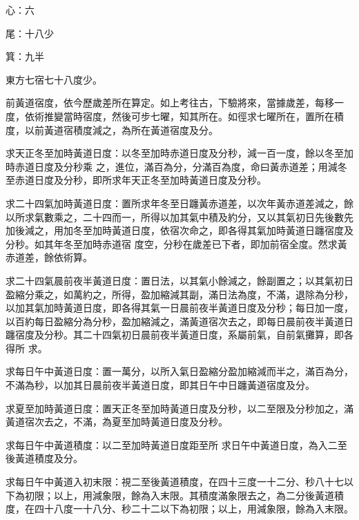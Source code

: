 \begin{pinyinscope}
 心：六



 尾：十八少



 箕：九半



 東方七宿七十八度少。



 前黃道宿度，依今歷歲差所在算定。如上考往古，下驗將來，當據歲差，每移一度，依術推變當時宿度，然後可步七曜，知其所在。如徑求七曜所在，置所在積度，以前黃道宿積度減之，為所在黃道宿度及分。



 求天正冬至加時黃道日度：以冬至加時赤道日度及分秒，減一百一度，餘以冬至加時赤道日度及分秒乘
 之，進位，滿百為分，分滿百為度，命曰黃赤道差；用減冬至赤道日度及分秒，即所求年天正冬至加時黃道日度及分秒。



 求二十四氣加時黃道日度：置所求年冬至日躔黃赤道差，以次年黃赤道差減之，餘以所求氣數乘之，二十四而一，所得以加其氣中積及約分，又以其氣初日先後數先加後減之，用加冬至加時黃道日度，依宿次命之，即各得其氣加時黃道日躔宿度及分秒。如其年冬至加時赤道宿
 度空，分秒在歲差已下者，即加前宿全度。然求黃赤道差，餘依術算。



 求二十四氣晨前夜半黃道日度：置日法，以其氣小餘減之，餘副置之；以其氣初日盈縮分乘之，如萬約之，所得，盈加縮減其副，滿日法為度，不滿，退除為分秒，以加其氣加時黃道日度，即各得其氣一日晨前夜半黃道日度及分秒；每日加一度，以百約每日盈縮分為分秒，盈加縮減之，滿黃道宿次去之，即每日晨前夜半黃道日躔宿度及分秒。其二十四氣初日晨前夜半黃道日度，系屬前氣，自前氣攤算，即各得所
 求。



 求每日午中黃道日度：置一萬分，以所入氣日盈縮分盈加縮減而半之，滿百為分，不滿為秒，以加其日晨前夜半黃道日度，即其日午中日躔黃道宿度及分。



 求夏至加時黃道日度：置天正冬至加時黃道日度及分秒，以二至限及分秒加之，滿黃道宿次去之，不滿，為夏至加時黃道日度及分秒。



 求每日午中黃道積度：以二至加時黃道日度距至所
 求日午中黃道日度，為入二至後黃道積度及分。



 求每日午中黃道入初末限：視二至後黃道積度，在四十三度一十二分、秒八十七以下為初限；以上，用減象限，餘為入末限。其積度滿象限去之，為二分後黃道積度，在四十八度一十八分、秒二十二以下為初限；以上，用減象限，餘為入末限。




\end{pinyinscope}
